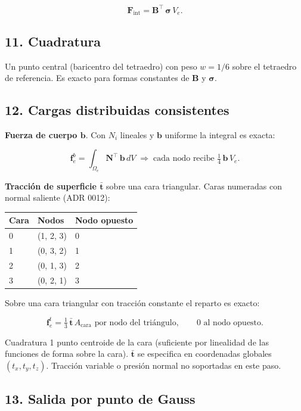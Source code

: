 \documentclass[11pt,letterpaper,oneside]{report}
\begin{document}
\[
\mathbf F_{\text{int}} = \mathbf B^\top\,\boldsymbol\sigma\, V_e.
\]

\subsection{11. Cuadratura}

Un punto central (baricentro del tetraedro) con peso $w = 1/6$ sobre el tetraedro de referencia. Es exacto para formas constantes de $\mathbf B$ y $\boldsymbol\sigma$.

\subsection{12. Cargas distribuidas consistentes}

\textbf{Fuerza de cuerpo $\mathbf b$}. Con $N_i$ lineales y $\mathbf b$ uniforme la integral es exacta:

\[
\mathbf f_e^{b} = \int_{\Omega_e} \mathbf N^\top\,\mathbf b\, dV \;\Longrightarrow\; \text{cada nodo recibe } \tfrac{1}{4}\,\mathbf b\,V_e.
\]

\textbf{Tracción de superficie $\bar{\mathbf t}$} sobre una cara triangular. Caras numeradas con normal saliente (ADR 0012):

\begin{center}
\begin{tabularx}{\textwidth}{YYY}
\hline
\textbf{Cara} & \textbf{Nodos} & \textbf{Nodo opuesto} \\
 & (1, 2, 3) & 0 \\
1 & (0, 3, 2) & 1 \\
2 & (0, 1, 3) & 2 \\
3 & (0, 2, 1) & 3 \\
\hline
\end{tabularx}
\end{center}
Sobre una cara triangular con tracción constante el reparto es exacto:

\[
\mathbf f_e^{t} = \tfrac{1}{3}\,\bar{\mathbf t}\,A_\text{cara} \text{ por nodo del triángulo}, \qquad 0 \text{ al nodo opuesto}.
\]

Cuadratura 1 punto centroide de la cara (suficiente por linealidad de las funciones de forma sobre la cara). $\bar{\mathbf t}$ se especifica en coordenadas globales $(t_x, t_y, t_z)$. Tracción variable o presión normal no soportadas en este paso.

\subsection{13. Salida por punto de Gauss}
\end{document}
